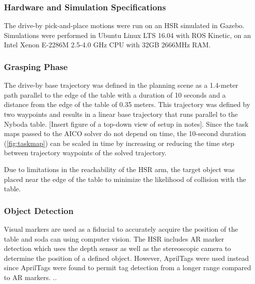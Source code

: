 \documentclass[12pt]{article}
\begin{document}
            \subsubsection{Hardware and Simulation Specifications}
                The drive-by pick-and-place motions were run on an HSR simulated in Gazebo. Simulations were performed in Ubuntu Linux LTS 16.04 with ROS Kinetic, on an Intel Xenon E-2286M 2.5-4.0 GHz CPU with 32GB 2666MHz RAM.
                
            \subsubsection{Grasping Phase}
                The drive-by base trajectory was defined in the planning scene as a 1.4-meter path parallel to the edge of the table with a duration of 10 seconds and a distance from the edge of the table of 0.35 meters. This trajectory was defined by two waypoints and results in a linear base trajectory that runs parallel to the Nyboda table. [Insert figure of a top-down view of setup in notes]. Since the task maps passed to the AICO solver do not depend on time, the 10-second duration (\cref{fig:taskmap}) can be scaled in time by increasing or reducing the time step between trajectory waypoints of the solved trajectory.

                \par Due to limitations in the reachability of the HSR arm, the target object was placed near the edge of the table to minimize the likelihood of collision with the table.

            \subsubsection{Object Detection}
                Visual markers are used as a fiducial to accurately acquire the position of the table and soda can using computer vision.
                The HSR includes AR marker detection which uses the depth sensor as well as the stereoscopic camera to determine the position of a defined object. However, AprilTags were used instead since AprilTags were found to permit tag detection from a longer range compared to AR markers. \cite{wang_apriltag_2016}.. 
\end{document}
